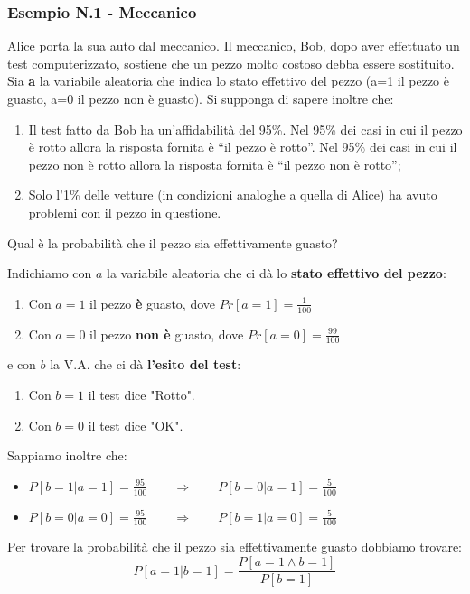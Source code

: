 \subsubsection{Esempio N.1 - Meccanico}
Alice porta la sua auto dal meccanico. Il meccanico, Bob,
dopo aver effettuato un test computerizzato, sostiene che un pezzo molto costoso debba essere sostituito. Sia \textbf{a} la variabile aleatoria che indica lo stato effettivo del pezzo (a=1 il pezzo è guasto, a=0 il pezzo non è guasto). Si supponga di sapere inoltre che:
\begin{enumerate}
	\item Il test fatto da Bob ha un’affidabilità del 95\%. Nel 95\% dei casi in cui il pezzo è rotto allora la risposta fornita è “il pezzo è rotto”. Nel 95\% dei casi in cui il pezzo non è rotto allora la risposta fornita è “il pezzo non è rotto”;
	\item Solo l’1\% delle vetture (in condizioni analoghe a quella di Alice) ha avuto problemi con il pezzo in questione. 
\end{enumerate}
Qual è la probabilità che il pezzo sia effettivamente guasto?

Indichiamo con $a$ la variabile aleatoria che ci dà lo \textbf{stato effettivo del pezzo}:
\begin{enumerate}
	\item Con $a=1$ il pezzo \textbf{è} guasto, dove $Pr[a=1] = \frac{1}{100}$
	\item Con $a=0$ il pezzo \textbf{non è} guasto, dove $Pr[a=0] = \frac{99}{100}$
\end{enumerate}

e con $b$ la V.A. che ci dà \textbf{l'esito del test}:

\begin{enumerate}
	\item Con $b=1$ il test dice "Rotto".
	\item Con $b=0$ il test dice "OK".
\end{enumerate} 

Sappiamo inoltre che:
\begin{itemize}
	\item $P[b=1|a=1] = \frac{95}{100} \qquad \Rightarrow \qquad P[b=0|a=1] = \frac{5}{100}$
	\item $P[b=0|a=0] = \frac{95}{100} \qquad \Rightarrow \qquad P[b=1|a=0] = \frac{5}{100}$
\end{itemize}

Per trovare la probabilità che il pezzo sia effettivamente guasto dobbiamo trovare:
$$
P[a=1|b=1] =  \frac{P[a=1 \wedge b=1]}{P[b=1]} 
$$

